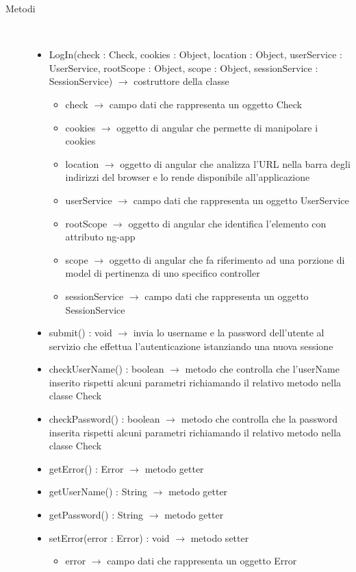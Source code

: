 \begin{description}
\item[Metodi] \hfill \\
\vspace{-7mm}
\begin{itemize}
	\item LogIn(check : Check, cookies : Object, location : Object, userService : UserService, rootScope : Object, scope : Object, sessionService : SessionService) $\rightarrow$ costruttore della classe\begin{itemize}
		\item check $\rightarrow$ campo dati che rappresenta un oggetto Check
		\item cookies $\rightarrow$ oggetto di angular che permette di manipolare i cookies
		\item location $\rightarrow$ oggetto di angular che analizza l'URL nella barra degli indirizzi del browser e lo rende disponibile all'applicazione
		\item userService $\rightarrow$ campo dati che rappresenta un oggetto UserService
		\item rootScope $\rightarrow$ oggetto di angular che identifica l’elemento con attributo ng-app
		\item scope $\rightarrow$ oggetto di angular che fa riferimento ad una porzione di model di pertinenza di uno specifico controller
		\item sessionService $\rightarrow$ campo dati che rappresenta un oggetto SessionService
	\end{itemize}
	
	\item submit() : void $\rightarrow$ invia lo username e la password dell'utente al servizio che effettua l'autenticazione istanziando una nuova sessione
	\item checkUserName() : boolean $\rightarrow$ metodo che controlla che l'userName inserito rispetti alcuni parametri richiamando il relativo metodo nella classe Check
	\item checkPassword() : boolean $\rightarrow$ metodo che controlla che la password inserita rispetti alcuni parametri richiamando il relativo metodo nella classe Check
	\item getError() : Error $\rightarrow$ metodo getter
	\item getUserName() : String $\rightarrow$ metodo getter
	\item getPassword() : String $\rightarrow$ metodo getter
	\item setError(error : Error) : void $\rightarrow$ metodo setter\begin{itemize}
		\item error $\rightarrow$ campo dati che rappresenta un oggetto Error
	\end{itemize}
	

\end{itemize}
\end{description}
